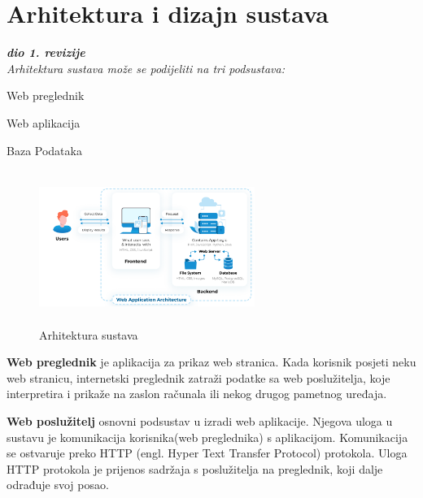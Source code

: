 \chapter{Arhitektura i dizajn sustava}
		
		\textbf{\textit{dio 1. revizije}}\\



               \textit{Arhitektura sustava može se podijeliti  na tri podsustava: }

              \begin{packed_item}
               \item  Web  preglednik
                \item   Web aplikacija
                \item    Baza Podataka

                \end{packed_item}

                 \begin{figure}[H]
                     \includegraphics[width=7cm, height=5cm ]{./slike/arhitektura.png}
                      \centering
                      \caption{Arhitektura sustava}
                  \end{figure}


                  \textbf{Web preglednik} je aplikacija za prikaz web stranica. Kada korisnik posjeti neku web stranicu, internetski preglednik zatraži podatke
                                 sa web poslužitelja, koje interpretira i prikaže na zaslon računala ili nekog drugog pametnog uređaja.

                  \textbf{Web poslužitelj} osnovni podsustav u izradi web aplikacije. Njegova uloga u sustavu je komunikacija korisnika(web preglednika) s 
                                 aplikacijom. Komunikacija se ostvaruje preko HTTP (engl. Hyper Text Transfer Protocol) protokola. Uloga HTTP protokola je prijenos 
                                 sadržaja s poslužitelja na preglednik, koji dalje odrađuje svoj posao.
                            
